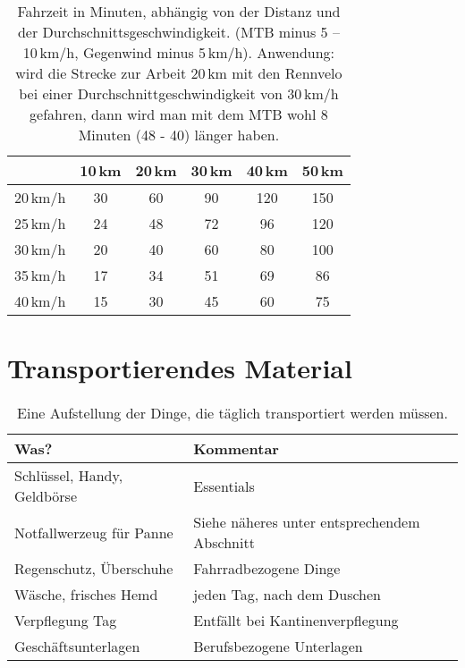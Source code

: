 \begin{table}
        \centering
        \begin{tabular}{cccccc}
                \toprule
            &	10\,km	&   20\,km	& 30\,km	&   40\,km	& 50\,km    \\
    \midrule
20\,km/h	&   30      &	60	    & 90        &   120	    & 150       \\
25\,km/h	&   24      &	48 &	72 &	96 &	120  \\
30\,km/h	&   20      &	40 & 	60& 	80 &	100 \\
35\,km/h	&   17      &	34 &	51& 	69 &	86 \\
40\,km/h	&   15      &	30 &	45& 	60 &	75 \\
\bottomrule
        \end{tabular}
        \caption{Fahrzeit in Minuten, abhängig von der Distanz und der Durchschnittsgeschwindigkeit.
        (MTB minus 5 -- 10\,km/h, Gegenwind minus 5\,km/h).
        Anwendung:
        wird die Strecke zur Arbeit 20\,km mit den Rennvelo bei einer Durchschnittgeschwindigkeit von
        30\,km/h gefahren,
        dann wird man mit dem MTB wohl 8 Minuten (48 - 40) länger haben.}
        \label{tab:fahrzeit}
\end{table}

\section{Transportierendes Material}

\begin{table}
  \centering
  \begin{tabular}{ll}
    \toprule
        Was?    & Kommentar \\
    \midrule
        Schlüssel, Handy, Geldbörse     & Essentials \\
        Notfallwerzeug für Panne        & Siehe näheres unter entsprechendem Abschnitt \\
        Regenschutz, Überschuhe         & Fahrradbezogene Dinge \\
        Wäsche, frisches Hemd           & jeden Tag, nach dem Duschen \\ 
        Verpflegung Tag                 & Entfällt bei Kantinenverpflegung \\
        Geschäftsunterlagen             & Berufsbezogene Unterlagen \\
    \bottomrule
  \end{tabular}
  \caption{Eine Aufstellung der Dinge, die täglich transportiert werden müssen.}
  \label{tab:transportmaterial}
\end{table}



